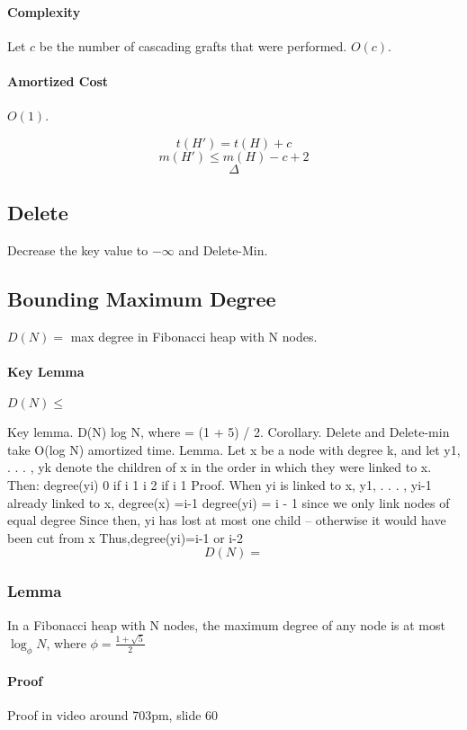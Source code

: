 \documentclass[a4paper]{article}
\begin{document}
\paragraph{Complexity}
Let $c$ be the number of cascading grafts that were performed. $O(c)$.

\paragraph{Amortized Cost}
$O(1)$.

\[t(H')=t(H)+c\]
\[m(H')\le m(H)-c+2\]
\[\Delta\]

\subsection{Delete}
Decrease the key value to $-\infty$ and Delete-Min.

\subsection{Bounding Maximum Degree}
$D(N)=$ max degree in Fibonacci heap with N nodes.

\paragraph{Key Lemma}
$D(N) \le $

Key lemma. D(N)   log  N, where   = (1 +  5) / 2.
Corollary. Delete and Delete-min take O(log N) amortized time.
Lemma. Let x be a node with degree k, and let y1, . . . , yk denote the children of x in the order in which they were linked to x. Then:
degree(yi)  
 0 if i 1  i 2 if i 1
Proof.
When yi is linked to x, y1, . . . , yi-1 already linked to x,
  degree(x) =i-1
  degree(yi) = i - 1 since we only link nodes of equal degree
Since then, yi has lost at most one child
– otherwise it would have been cut from x Thus,degree(yi)=i-1 or i-2
\[D(N)=\]


\subsubsection{Lemma}
In a Fibonacci heap with N nodes, the maximum degree of any node is at most $\log_\phi N$, where $\phi=\frac{1+\sqrt{5}}{2}$

\paragraph{Proof}
Proof in video around 703pm, slide 60
\end{document}
